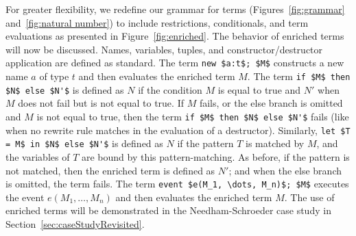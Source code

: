 \documentclass{book}
\begin{document}
For greater flexibility, we redefine our grammar for terms (Figures~\ref{fig:grammar} and~\ref{fig:natural number}) to include restrictions, conditionals, and term evaluations as presented in Figure~\ref{fig:enriched}. The behavior of enriched terms will now be discussed. Names, variables, tuples, and constructor/destructor application are defined as standard. The term \lstinline!new $a:t$; $M$! constructs a new name $a$ of type $t$ and then evaluates the enriched term $M$. The term \lstinline!if $M$ then $N$ else $N'$! is defined as $N$ if the condition $M$ is equal to true and $N'$ when $M$ does not fail but is not equal to true. If $M$ fails, or the else branch is omitted and $M$ is not equal to true, then the term \lstinline!if $M$ then $N$ else $N'$! fails (like when no rewrite rule matches in the evaluation of a destructor). Similarly, \lstinline!let $T = M$ in $N$ else $N'$! is defined as $N$ if the pattern $T$ is matched by $M$, and the variables of $T$ are bound by this pattern-matching.  As before, if the pattern is not matched, then the enriched term is defined as $N'$; and when the else branch is omitted, the term fails.
The term \lstinline!event $e(M_1, \dots, M_n)$; $M$! executes the event $e(M_1, \dots, M_n)$ and then evaluates the enriched term $M$.
%
The use of enriched terms will be demonstrated in the Needham-Schroeder case study in Section~\ref{sec:caseStudyRevisited}.
\end{document}
